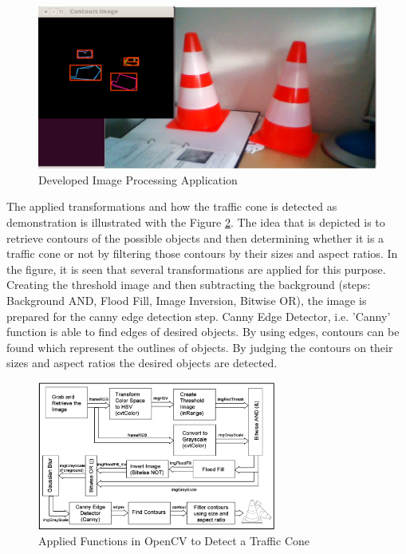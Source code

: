 \begin{figure}[!ht]
	\centering
	\includegraphics[scale=0.15]{content/images/traffic_cone_detection.png}
	\caption{Developed Image Processing Application}
	\label{fig:traffic_cone_detection}
\end{figure}

The applied transformations and how the traffic cone is detected as demonstration is illustrated with the Figure \ref{fig:imageproc}. The idea that is depicted is to retrieve contours of the possible objects and then determining whether it is a traffic cone or not by filtering those contours by their sizes and aspect ratios. In the figure, it is seen that several transformations are applied for this purpose. Creating the threshold image and then subtracting the background (steps: Background AND, Flood Fill, Image Inversion, Bitwise OR), the image is prepared for the canny edge detection step. Canny Edge Detector, i.e. 'Canny' function is able to find edges of desired objects. By using edges, contours can be found which represent the outlines of objects. By judging the contours on their sizes and aspect ratios the desired objects are detected.

\begin{figure}[!ht]
	\centering
	\includegraphics[width=0.7\textwidth]{content/images/imageproc.png}
	\caption{Applied Functions in OpenCV to Detect a Traffic Cone}
	\label{fig:imageproc}
\end{figure}

